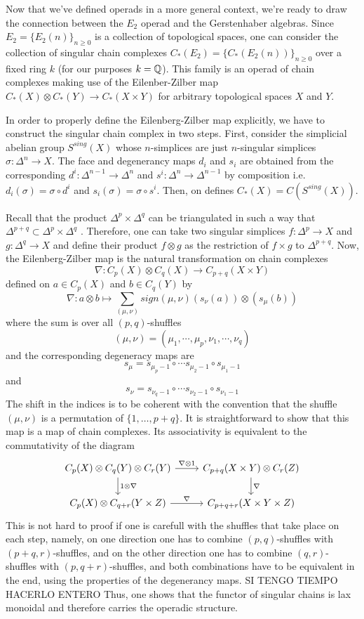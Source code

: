 \documentclass[TFM.tex]{subfiles}
\begin{document}
Now that we've defined operads in a more general context, we're ready to draw the connection between the $E_2$ operad and the Gerstenhaber algebras. Since $E_2=\{E_2(n)\}_{n\geq 0}$ is a collection of topological spaces, one can consider the collection of singular chain complexes $C_*(E_2)=\{C_*(E_2(n))\}_{n\geq 0}$ over a fixed ring $k$ (for our purposes $k=\mathbb{Q}$). This family is an operad of chain complexes making use of the Eilenber-Zilber map \cite{EZ} $C_*(X)\otimes C_*(Y)\to C_*(X\times Y)$ for arbitrary topological spaces $X$ and $Y$. 

In order to properly define the Eilenberg-Zilber map explicitly, we have to construct the singular chain complex in two steps. First, consider the simplicial abelian group $S^{sing}(X)$ whose $n$-simplices are just $n$-singular simplices $\sigma:\Delta^n\to X$. The face and degenerancy maps $d_i$ and $s_i$ are obtained from the corresponding $d^i:\Delta^{n-1}\to \Delta^{n}$ and $s^i:\Delta^n\to\Delta^{n-1}$ by composition i.e. $d_i(\sigma)=\sigma\circ d^i$ and $s_i(\sigma)=\sigma\circ s^i$. Then, on defines $C_*(X)=C(S^{sing}(X))$.

Recall that the product $\Delta^p\times\Delta^q$ can be triangulated in such a way that $\Delta^{p+q}\subset \Delta^p\times\Delta^q$ \cite{Hatcher}. Therefore, one can take two singular simplices $f:\Delta^p\to X$ and $g:\Delta^q\to X$ and define their product $f\otimes g$ as the restriction of $f\times g$ to $\Delta^{p+q}$. Now, the Eilenberg-Zilber map is the natural transformation on chain complexes
\[
\nabla :  C_p(X) \otimes C_q(X) \to C_{p+q}(X \times Y)
\]
defined on $a\in C_p(X)$ and $b\in C_q(Y)$ by 
\[
\nabla : a \otimes b \mapsto 
   \sum_{(\mu,\nu)} sign(\mu,\nu) (s_\nu(a)) \otimes (s_\mu(b))
\]
where the sum is over all $(p,q)$-shuffles
\[
(\mu,\nu) = (\mu_1, \cdots, \mu_p, \nu_1, \cdots, \nu_q)
\]
and the corresponding degeneracy maps are
\[
s_{\mu} = s_{\mu_p - 1} \circ \cdots s_{\mu_2 - 1} \circ s_{\mu_1 - 1}
\]
and
\[
s_{\nu} = s_{\nu_q - 1} \circ \cdots s_{\nu_2 - 1} \circ s_{\nu_1 - 1}
\]
The shift in the indices is to be coherent with the convention that the shuffle $(μ,ν)$ is a permutation of $\{1,\dots,p+q\}$. It is straightforward to show that this map is a map of chain complexes. Its associativity is equivalent to the commutativity of the diagram
\[
\begin{tikzcd}
C_p(X)\otimes C_q(Y)\otimes C_r(Y)\arrow[r, "\nabla\otimes 1"]\arrow[d, "1\otimes\nabla"] & C_{p+q}(X\times Y)\otimes C_r(Z)\arrow[d,"\nabla"]\\
C_p(X)\otimes C_{q+r}(Y\times Z)\arrow[r, "\nabla"] & C_{p+q+r}(X\times Y\times Z)
\end{tikzcd}
\]
This is not hard to proof if one is carefull with the shuffles that take place on each step, namely, on one direction one has to combine $(p,q)$-shuffles with $(p+q,r)$-shuffles, and on the other direction one has to combine $(q,r)$-shuffles with $(p,q+r)$-shuffles, and both combinations have to be equivalent in the end, using the properties of the degenerancy maps. SI TENGO TIEMPO HACERLO ENTERO Thus, one shows that the functor of singular chains is lax monoidal and therefore carries the operadic structure.
\end{document}

